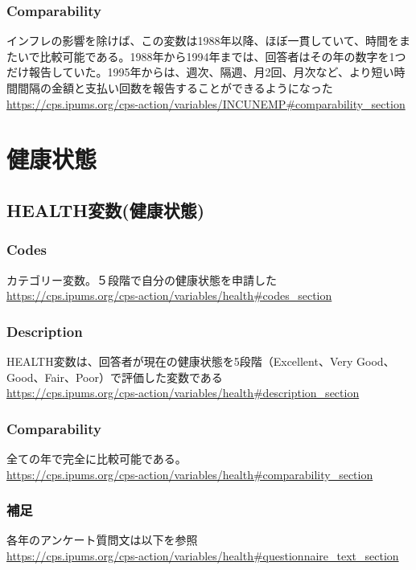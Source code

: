 \documentclass{jsarticle}
\begin{document}
\subsubsection{Comparability}
インフレの影響を除けば、この変数は1988年以降、ほぼ一貫していて、時間をまたいで比較可能である。1988年から1994年までは、回答者はその年の数字を1つだけ報告していた。1995年からは、週次、隔週、月2回、月次など、より短い時間間隔の金額と支払い回数を報告することができるようになった\\
\url{https://cps.ipums.org/cps-action/variables/INCUNEMP#comparability_section}

\section{健康状態}

\subsection{HEALTH変数(健康状態)}

\subsubsection{Codes}
カテゴリー変数。５段階で自分の健康状態を申請した\\
\url{https://cps.ipums.org/cps-action/variables/health#codes_section}

\subsubsection{Description}
HEALTH変数は、回答者が現在の健康状態を5段階（Excellent、Very Good、Good、Fair、Poor）で評価した変数である\\
\url{https://cps.ipums.org/cps-action/variables/health#description_section}

\subsubsection{Comparability}
全ての年で完全に比較可能である。\\
\url{https://cps.ipums.org/cps-action/variables/health#comparability_section}

\subsubsection{補足}
各年のアンケート質問文は以下を参照\\
\url{https://cps.ipums.org/cps-action/variables/health#questionnaire_text_section}
\end{document}
